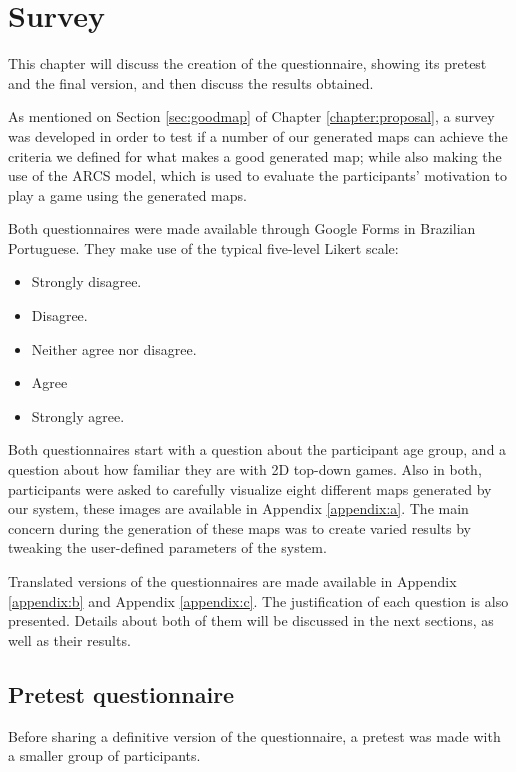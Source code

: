 \chapter{Survey}
\label{chapter:survey}

This chapter will discuss the creation of the questionnaire, showing its pretest and the final version, and then discuss the results obtained.

As mentioned on Section \ref{sec:goodmap} of Chapter \ref{chapter:proposal}, a survey was developed in order to test if a number of our generated maps can achieve the criteria we defined for what makes a good generated map; while also making the use of the ARCS model, which is used to evaluate the participants' motivation to play a game using the generated maps. 

Both questionnaires were made available through Google Forms in Brazilian Portuguese. They make use of the typical five-level Likert scale:
\begin{itemize}
    \item Strongly disagree.
    \item Disagree.
    \item Neither agree nor disagree.
    \item Agree
    \item Strongly agree.
\end{itemize}

Both questionnaires start with a question about the participant age group, and a question about how familiar they are with 2D top-down games. Also in both, participants were asked to carefully visualize eight different maps generated by our system, these images are available in Appendix \ref{appendix:a}. The main concern during the generation of these maps was to create varied results by tweaking the user-defined parameters of the system.

Translated versions of the questionnaires are made available in Appendix \ref{appendix:b} and Appendix \ref{appendix:c}. The justification of each question is also presented. Details about both of them will be discussed in the next sections, as well as their results.
 
\section{Pretest questionnaire}

Before sharing a definitive version of the questionnaire, a pretest was made with a smaller group of participants.

